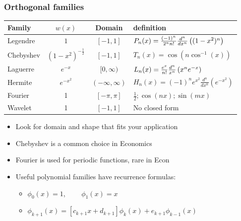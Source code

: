 \documentclass[bigger]{beamer}
\begin{document}
\begin{frame}%

\frametitle{Orthogonal families}

\begin{tabular}{lccl}
\textbf{Family} & $w(x)$ & \textbf{Domain} & \textbf{definition} \\ \hline
Legendre & $1$ & $[-1,1]$ & $P_{n}(x)=\frac{(-1)^{n}}{2^{n}n!}\frac{d^{n}}{%
dx^{n}}\left( (1-x^{2})^{n}\right) $ \\ 
Chebyshev & $(1-x^{2})^{-\frac{1}{2}}$ & $[-1,1]$ & $T_{n}(x)=\cos \left(
n\cos ^{-1}(x)\right) $ \\ 
Laguerre & $e^{-x}$ & $[0,\infty )$ & $L_{n}(x)=\frac{e^{x}}{n!}\frac{d^{n}}{%
x^{n}}\left( x^{n}e^{-x}\right) $ \\ 
Hermite & $e^{-x^{2}}$ & $(-\infty ,\infty )$ & $H_{n}(x)=(-1)^{n}e^{x^{2}}%
\frac{d^{n}}{dx^{n}}\left( e^{-x^{2}}\right) $ \\ 
Fourier & 1 & $[-\pi ,\pi ]$ & $\frac{1}{2};\cos (nx);\sin (mx)$ \\
Wavelet & 1 & $[-1,1]$ & No closed form \\%
\end{tabular}

\begin{itemize}
\item Look for domain and shape that fits your application

\item Chebyshev is a common choice in Economics

\item Fourier is used for periodic functions, rare in Econ

\item Useful polynomial families have recurrence formulas:

\begin{itemize}
\item $\phi _{0}(x)=1$, $\qquad \phi _{1}(x)=x$

\item $\phi _{k+1}(x)=\left[ c_{k+1}x+d_{k+1}\right] \phi
_{k}(x)+e_{k+1}\phi _{k-1}(x)$
\end{itemize}

\end{itemize}


\end{frame}%
\end{document}
